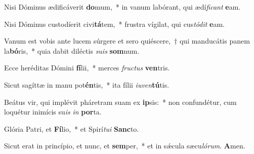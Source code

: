 \item Nisi Dóminus ædificáverit \textbf{do}mum,~* in vanum labórant, qui ædí\textit{fi}\textit{cant} \textbf{e}am.

\item Nisi Dóminus custodíerit civi\textbf{tá}tem,~* frustra vígilat, qui cus\textit{tó}\textit{dit} \textbf{e}am.

\item Vanum est vobis ante lucem súrgere et sero quiéscere,~† qui manducátis panem la\textbf{bó}ris,~* quia dabit diléctis \textit{su}\textit{is} \textbf{som}num.

\item Ecce heréditas Dómini \textbf{fí}lii,~* merces \textit{fruc}\textit{tus} \textbf{ven}tris.

\item Sicut sagíttæ in manu pot\textbf{én}tis,~* ita fílii \textit{iu}\textit{ven}\textbf{tú}tis.

\item Beátus vir, qui implévit pháretram suam ex \textbf{ip}sis:~* non confundétur, cum loquétur inimícis su\textit{is} \textit{in} \textbf{por}ta.

\item Glória Patri, et \textbf{Fí}lio,~* et Spirí\textit{tu}\textit{i} \textbf{Sanc}to.

\item Sicut erat in princípio, et nunc, et \textbf{sem}per,~* et in sǽcula sæcu\textit{ló}\textit{rum}. \textbf{A}men.